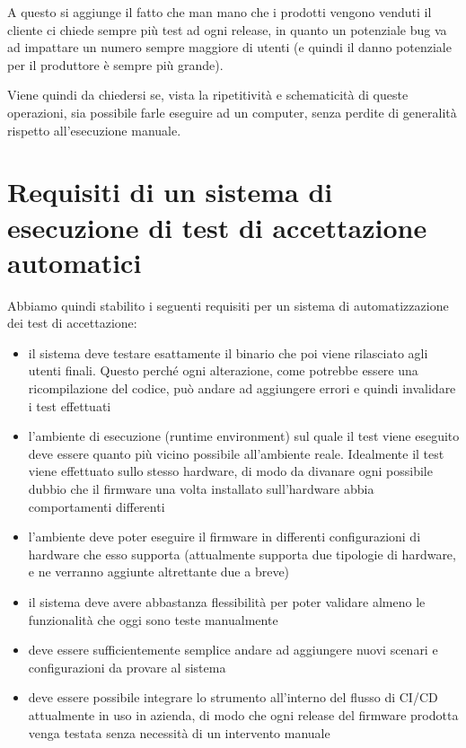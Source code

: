 \documentclass[12pt,a4paper,twoside,titlepage]{book}
\begin{document}
A questo si aggiunge il fatto che man mano che i prodotti vengono venduti il cliente ci
chiede sempre più test ad ogni release, in quanto un potenziale bug va ad impattare un numero
sempre maggiore di utenti (e quindi il danno potenziale per il produttore è sempre più grande).

Viene quindi da chiedersi se, vista la ripetitività e schematicità di queste operazioni,
sia possibile farle eseguire ad un computer, senza perdite di generalità rispetto all'esecuzione
manuale.

\section{Requisiti di un sistema di esecuzione di test di accettazione automatici}

Abbiamo quindi stabilito i seguenti requisiti per un sistema di automatizzazione dei test di
accettazione:

\begin{itemize}
    \item il sistema deve testare esattamente il binario che poi viene rilasciato agli utenti finali.
        Questo perché ogni alterazione, come potrebbe essere una ricompilazione del codice, può andare
        ad aggiungere errori e quindi invalidare i test effettuati
    \item l'ambiente di esecuzione (runtime environment) sul quale il test viene eseguito deve essere quanto
        più vicino possibile all'ambiente reale. Idealmente il test viene effettuato sullo stesso hardware,
        di modo da divanare ogni possibile dubbio che il firmware una volta installato sull'hardware abbia
        comportamenti differenti
    \item l'ambiente deve poter eseguire il firmware in differenti configurazioni di hardware che esso supporta
        (attualmente supporta due tipologie di hardware, e ne verranno aggiunte altrettante due a breve)
    \item il sistema deve avere abbastanza flessibilità per poter validare almeno le funzionalità che oggi
        sono teste manualmente
    \item deve essere sufficientemente semplice andare ad aggiungere nuovi scenari e configurazioni da provare al sistema
    \item deve essere possibile integrare lo strumento all'interno del flusso di CI/CD attualmente in
        uso in azienda, di modo che ogni release del firmware prodotta venga testata senza necessità di
        un intervento manuale
\end{itemize}
\end{document}
